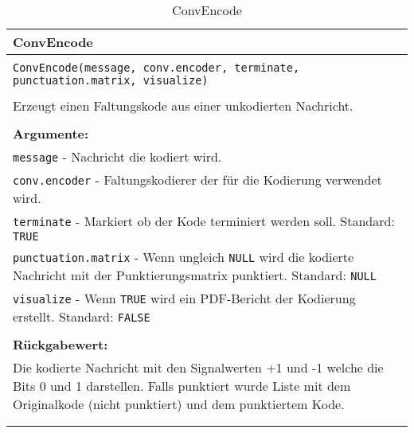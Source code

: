 \begin{longtable}{|p{\textwidth}|}
\hline
\rowcolor{lightblue}
ConvEncode
\\
\hline
\\
\texttt{ConvEncode(message, conv.encoder, terminate, punctuation.matrix, visualize)}\\
\\
Erzeugt einen Faltungskode aus einer unkodierten Nachricht.\\
\\
\textbf{Argumente:}\\
\texttt{message} - Nachricht die kodiert wird.\\
\texttt{conv.encoder} - Faltungskodierer der für die Kodierung verwendet wird.\\
\texttt{terminate} - Markiert ob der Kode terminiert werden soll. Standard: \texttt{TRUE}\\
\texttt{punctuation.matrix} - Wenn ungleich \texttt{NULL} wird die kodierte Nachricht mit der Punktierungsmatrix punktiert. Standard: \texttt{NULL}\\
\texttt{visualize} - Wenn \texttt{TRUE} wird ein PDF-Bericht der Kodierung erstellt. Standard: \texttt{FALSE}\\
\\
\textbf{Rückgabewert:}\\
Die kodierte Nachricht mit den Signalwerten +1 und -1 welche die Bits 0 und 1 darstellen. Falls punktiert wurde Liste mit dem Originalkode (nicht punktiert) und dem punktiertem Kode.\\
\\
\hline
\caption{ConvEncode}
\label{funktion:ConvEncode}
\end{longtable}